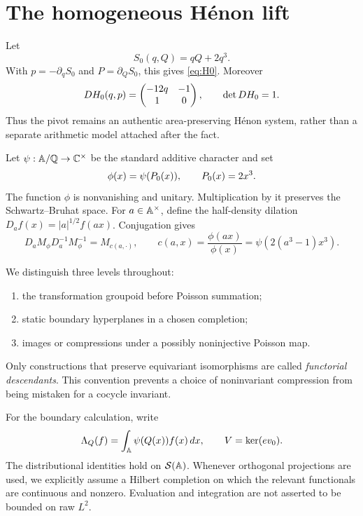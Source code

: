 \section{The homogeneous H\'enon lift}

Let
\begin{equation}\label{eq:generating}
  S_0(q,Q)=qQ+2q^3.
\end{equation}
With \(p=-\partial_qS_0\) and \(P=\partial_QS_0\), this gives
\eqref{eq:H0}.  Moreover
\[
  DH_0(q,p)=\begin{pmatrix}-12q&-1\\1&0\end{pmatrix},
  \qquad \det DH_0=1.
\]
Thus the pivot remains an authentic area-preserving H\'enon system, rather
than a separate arithmetic model attached after the fact.

Let \(\psi:\mathbb{A}/\mathbb{Q}\to\mathbb{C}^\times\) be the standard additive character and set
\begin{equation}\label{eq:phi}
  \phi(x)=\psi(P_0(x)),\qquad P_0(x)=2x^3.
\end{equation}
The function \(\phi\) is nonvanishing and unitary.  Multiplication by it
preserves the Schwartz--Bruhat space.  For \(a\in\mathbb{A}^\times\), define the
half-density dilation \(D_af(x)=|a|^{1/2}f(ax)\).  Conjugation gives
\begin{equation}\label{eq:cocycle}
  D_aM_\phi D_a^{-1}M_\phi^{-1}
  =M_{c(a,\cdot)},
  \qquad
  c(a,x)=\frac{\phi(ax)}{\phi(x)}
         =\psi\!\left(2(a^3-1)x^3\right).
\end{equation}

We distinguish three levels throughout:
\begin{enumerate}[label=(\alph*)]
  \item the transformation groupoid before Poisson summation;
  \item static boundary hyperplanes in a chosen completion;
  \item images or compressions under a possibly noninjective Poisson map.
\end{enumerate}
Only constructions that preserve equivariant isomorphisms are called
\emph{functorial descendants}.  This convention prevents a choice of
noninvariant compression from being mistaken for a cocycle invariant.

For the boundary calculation, write
\[
  \Lambda_Q(f)=\int_{\mathbb{A}}\psi(Q(x))f(x)\,dx,
  \qquad V=\ker(ev_0).
\]
The distributional identities hold on \(\mathcal{S}(\mathbb{A})\).  Whenever orthogonal
projections are used, we explicitly assume a Hilbert completion on which
the relevant functionals are continuous and nonzero.  Evaluation and
integration are not asserted to be bounded on raw \(L^2\).
